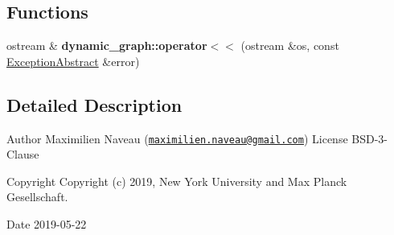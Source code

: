 \subsection*{Functions}
\begin{DoxyCompactItemize}
\item 
ostream \& {\bfseries dynamic\+\_\+graph\+::operator$<$$<$} (ostream \&os, const \hyperlink{classdynamic__graph_1_1ExceptionAbstract}{Exception\+Abstract} \&error)\hypertarget{namespacedynamic__graph_a44046716acbcd14008a1672f9bb71594}{}\label{namespacedynamic__graph_a44046716acbcd14008a1672f9bb71594}

\end{DoxyCompactItemize}


\subsection{Detailed Description}
\begin{DoxyAuthor}{Author}
Maximilien Naveau (\href{mailto:maximilien.naveau@gmail.com}{\tt maximilien.\+naveau@gmail.\+com})  License B\+S\+D-\/3-\/\+Clause 
\end{DoxyAuthor}
\begin{DoxyCopyright}{Copyright}
Copyright (c) 2019, New York University and Max Planck Gesellschaft. 
\end{DoxyCopyright}
\begin{DoxyDate}{Date}
2019-\/05-\/22 
\end{DoxyDate}
